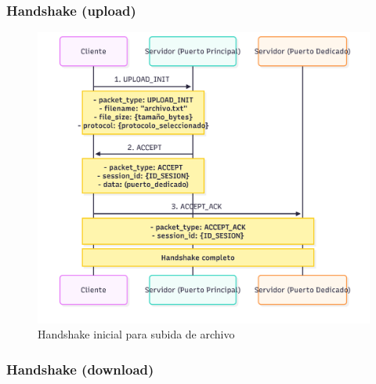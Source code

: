 \subsubsection{Handshake (upload)}

\begin{figure}[H]
    \centering
    \includegraphics[width=1\linewidth]{images/UPLOAD_HANDSHAKE}
    \caption{Handshake inicial para subida de archivo}
    \label{fig:placeholder}
\end{figure}

\subsubsection{Handshake (download)}


